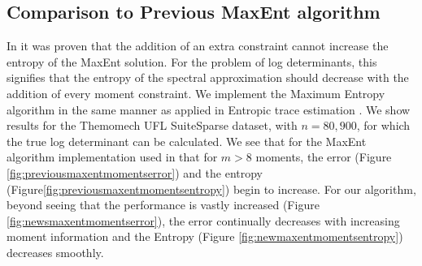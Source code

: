 \documentclass[letterpaper]{article} %
\begin{document}
\subsection{Comparison to Previous MaxEnt algorithm}
In \cite{Granziol2017} it was proven that the addition of an extra constraint cannot increase the entropy of the MaxEnt solution. For the problem of log determinants, this signifies that the entropy of the spectral approximation should decrease with the addition of every moment constraint. We implement the Maximum Entropy algorithm \cite{bandyopadhyay2005maximum} in the same manner as applied in Entropic trace estimation \cite{ete}. We show results for the Themomech UFL SuiteSparse dataset, with $n=80,900$, for which the true log determinant can be calculated. We see that for the MaxEnt algorithm \cite{bandyopadhyay2005maximum} implementation used in\cite{ete} that for $m > 8$ moments, the error (Figure \ref{fig:previousmaxentmomentserror}) and the entropy (Figure\ref{fig:previousmaxentmomentsentropy}) begin to increase. For our algorithm, beyond seeing that the performance is vastly increased (Figure \ref{fig:newsmaxentmomentserror}), the error continually decreases with increasing moment information and the Entropy (Figure \ref{fig:newmaxentmomentsentropy}) decreases smoothly.
\end{document}
